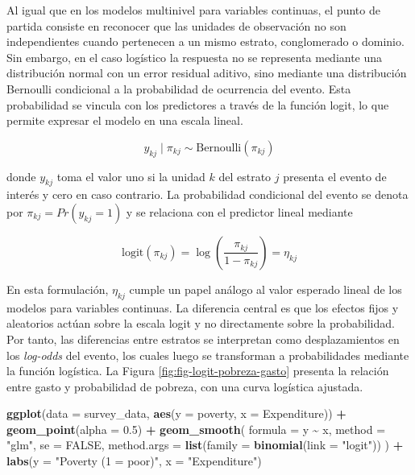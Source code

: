 \documentclass[
  spanish,
  12pt,
]{book}
\newenvironment{Shaded}{\begin{snugshade}}{\end{snugshade}}
\newcommand{\AttributeTok}[1]{\textcolor[rgb]{0.13,0.29,0.53}{#1}}
\newcommand{\ConstantTok}[1]{\textcolor[rgb]{0.56,0.35,0.01}{#1}}
\newcommand{\FloatTok}[1]{\textcolor[rgb]{0.00,0.00,0.81}{#1}}
\newcommand{\FunctionTok}[1]{\textcolor[rgb]{0.13,0.29,0.53}{\textbf{#1}}}
\newcommand{\NormalTok}[1]{#1}
\newcommand{\SpecialCharTok}[1]{\textcolor[rgb]{0.81,0.36,0.00}{\textbf{#1}}}
\newcommand{\StringTok}[1]{\textcolor[rgb]{0.31,0.60,0.02}{#1}}
\begin{document}
Al igual que en los modelos multinivel para variables continuas, el punto de partida consiste en reconocer que las unidades de observación no son independientes cuando pertenecen a un mismo estrato, conglomerado o dominio. Sin embargo, en el caso logístico la respuesta no se representa mediante una distribución normal con un error residual aditivo, sino mediante una distribución Bernoulli condicional a la probabilidad de ocurrencia del evento. Esta probabilidad se vincula con los predictores a través de la función logit, lo que permite expresar el modelo en una escala lineal.

\[
y_{kj} \mid \pi_{kj} \sim \text{Bernoulli}(\pi_{kj})
\]

donde \(y_{kj}\) toma el valor uno si la unidad \(k\) del estrato \(j\) presenta el evento de interés y cero en caso contrario. La probabilidad condicional del evento se denota por \(\pi_{kj}=Pr(y_{kj}=1)\) y se relaciona con el predictor lineal mediante

\[
\text{logit}(\pi_{kj}) =
\log\left(\frac{\pi_{kj}}{1-\pi_{kj}}\right)
= \eta_{kj}
\]

En esta formulación, \(\eta_{kj}\) cumple un papel análogo al valor esperado lineal de los modelos para variables continuas. La diferencia central es que los efectos fijos y aleatorios actúan sobre la escala logit y no directamente sobre la probabilidad. Por tanto, las diferencias entre estratos se interpretan como desplazamientos en los \emph{log-odds} del evento, los cuales luego se transforman a probabilidades mediante la función logística. La Figura \ref{fig:fig-logit-pobreza-gasto} presenta la relación entre gasto y probabilidad de pobreza, con una curva logística ajustada.

\begin{Shaded}
\begin{Highlighting}[]
\FunctionTok{ggplot}\NormalTok{(}\AttributeTok{data =}\NormalTok{ survey\_data,}
       \FunctionTok{aes}\NormalTok{(}\AttributeTok{y =}\NormalTok{ poverty, }\AttributeTok{x =}\NormalTok{ Expenditure)) }\SpecialCharTok{+}
  \FunctionTok{geom\_point}\NormalTok{(}\AttributeTok{alpha =} \FloatTok{0.5}\NormalTok{) }\SpecialCharTok{+}
  \FunctionTok{geom\_smooth}\NormalTok{(}
    \AttributeTok{formula =}\NormalTok{ y }\SpecialCharTok{\textasciitilde{}}\NormalTok{ x,}
    \AttributeTok{method =} \StringTok{"glm"}\NormalTok{,}
    \AttributeTok{se =} \ConstantTok{FALSE}\NormalTok{,}
    \AttributeTok{method.args =} \FunctionTok{list}\NormalTok{(}\AttributeTok{family =} \FunctionTok{binomial}\NormalTok{(}\AttributeTok{link =} \StringTok{"logit"}\NormalTok{))}
\NormalTok{  ) }\SpecialCharTok{+}
  \FunctionTok{labs}\NormalTok{(}\AttributeTok{y =} \StringTok{"Poverty (1 = poor)"}\NormalTok{, }\AttributeTok{x =} \StringTok{"Expenditure"}\NormalTok{)}
\end{Highlighting}
\end{Shaded}
\end{document}
